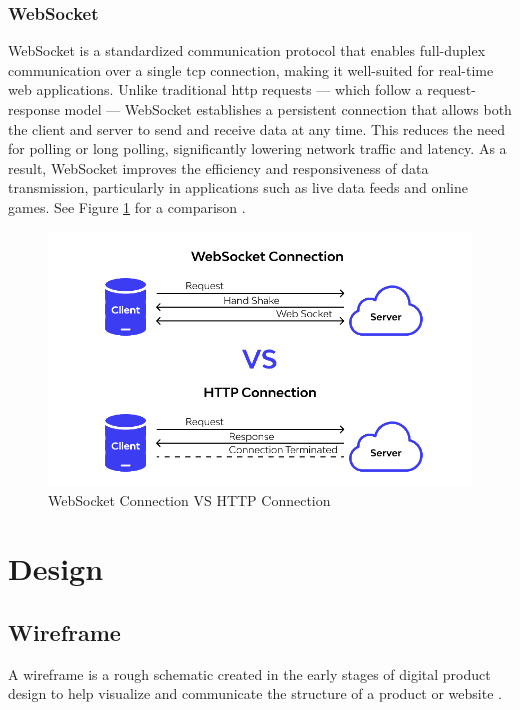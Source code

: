 {\subsubsection*{WebSocket}
\label{subsubsec:websocket}

WebSocket is a standardized communication protocol that enables full-duplex communication over a single \gls{tcp} connection, making it well-suited for real-time web applications. Unlike traditional \gls{http} requests — which follow a request-response model — WebSocket establishes a persistent connection that allows both the client and server to send and receive data at any time. This reduces the need for polling or long polling, significantly lowering network traffic and latency. As a result, WebSocket improves the efficiency and responsiveness of data transmission, particularly in applications such as live data feeds and online games. See Figure \ref{fig:websocket-vs-http} for a comparison \cite{nodejs:websocket, apidog:websocket}.


\begin{figure}[h!]
    \centering
    \includegraphics[width=0.75\linewidth]{figures/theory/websocket-vs-http.png}
    \caption[WebSocket Connection VS HTTP Connection]{WebSocket Connection VS HTTP Connection \cite{apidog:websocket}}
    \label{fig:websocket-vs-http}
\end{figure}

\section{Design}
\label{sec:design}

\subsection{Wireframe}
\label{subsec:wireframe}

A wireframe is a rough schematic created in the early stages of digital product design to help visualize and communicate the structure of a product or website \cite{balsamiq:wireframe}. \\

}
